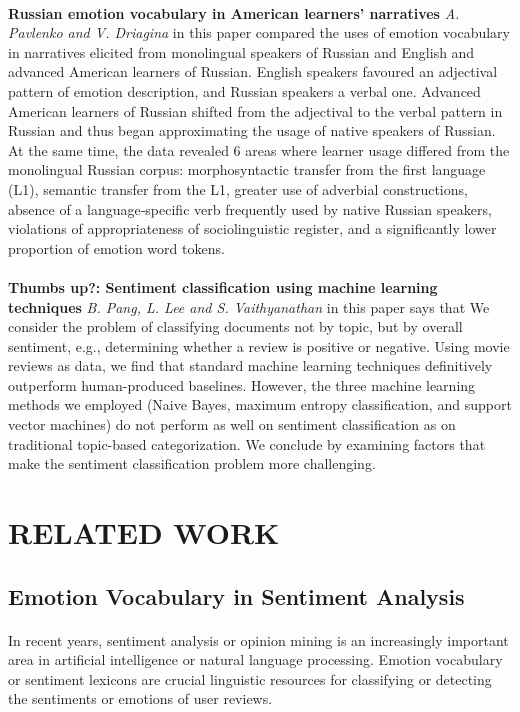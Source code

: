 \documentclass[a4paper,12pt,oneside]{article}
\begin{document}
\paragraph{}
\textbf{Russian emotion vocabulary in American learners’ narratives} 
\textit{A. Pavlenko and V. Driagina} in this paper
compared the uses of emotion vocabulary in narratives elicited from monolingual speakers of Russian and English and advanced American learners of Russian. English speakers favoured an adjectival pattern of emotion description, and Russian speakers a verbal one. Advanced American learners of Russian shifted from the adjectival to the verbal pattern in Russian and thus began approximating the usage of native speakers of Russian. At the same time, the data revealed 6 areas where learner usage differed from the monolingual Russian corpus: morphosyntactic transfer from the first language (L1), semantic transfer from the L1, greater use of adverbial constructions, absence of a language‐specific verb frequently used by native Russian speakers, violations of appropriateness of sociolinguistic register, and a significantly lower proportion of emotion word tokens.
\paragraph{}
\textbf{Thumbs up?: Sentiment classification using machine learning techniques} 
\textit{B. Pang, L. Lee and S. Vaithyanathan} in this paper says that
We consider the problem of classifying documents not by topic, but by overall sentiment, e.g., determining whether a review is positive or negative. Using movie reviews as data, we find that standard machine learning techniques definitively outperform human-produced baselines. However, the three machine learning methods we employed (Naive Bayes, maximum entropy classification, and support vector machines) do not perform as well on sentiment classification as on traditional topic-based categorization. We conclude by examining factors that make the sentiment classification problem more challenging.

\newpage
\section{RELATED WORK}
\subsection{Emotion Vocabulary in Sentiment Analysis}
\paragraph{}
In recent years, sentiment analysis or opinion mining is an increasingly important area in artificial intelligence or natural language processing. Emotion vocabulary or sentiment lexicons are crucial linguistic resources for classifying or detecting the sentiments or emotions of user reviews.
\end{document}
